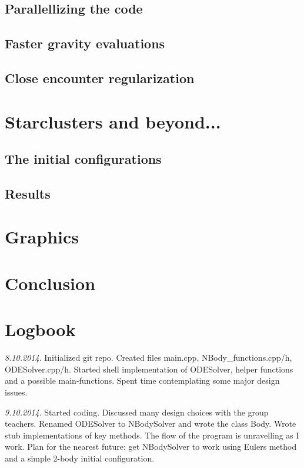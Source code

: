 \documentclass[11pt, oneside]{article}   	%
\begin{document}
\subsection{Parallellizing the code}
\subsection{Faster gravity evaluations}
\subsection{Close encounter regularization}

\section{Starclusters and beyond...}
\subsection{The initial configurations}
\subsection{Results}

\section{Graphics}

\section{Conclusion}



\newpage
\section{Logbook}

\emph{8.10.2014}. 
Initialized git repo. Created files main.cpp, NBody\_functions.cpp/h, ODESolver.cpp/h. Started shell implementation of ODESolver, helper functions and a possible main-functions. Spent time contemplating some major design issues.

\emph{9.10.2014}.
Started coding. Discussed many design choices with the group teachers. Renamed ODESolver to NBodySolver and wrote the class Body. Wrote stub implementations of key methods. The flow of the program is unravelling as I work. Plan for the nearest future: get NBodySolver to work using Eulers method and a simple 2-body initial configuration.  
\end{document}
